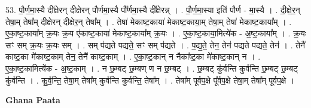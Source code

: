 \documentclass[17pt]{extarticle}
\begin{document}
53. पौ॒र्ण॒मा॒स्यै दी᳚क्षेरन् दीक्षेरन् पौर्णमा॒स्यै पौ᳚र्णमा॒स्यै दी᳚क्षेरन्न् । . पौ॒र्ण॒मा॒स्या इति॑ पौर्ण - मा॒स्यै । . दी॒क्षे॒र॒न् तेषा॒म् तेषा᳚म् दीक्षेरन् दीक्षेर॒न् तेषा᳚म् । . तेषा॑ मेकाष्ट॒काया॑ मेकाष्ट॒काया॒म् तेषा॒म् तेषा॑ मेकाष्ट॒काया᳚म् । . ए॒का॒ष्ट॒काया᳚म् क्र॒यः क्र॒य ए॑काष्ट॒काया॑ मेकाष्ट॒काया᳚म् क्र॒यः । . ए॒का॒ष्ट॒काया॒मित्ये॑क - अ॒ष्ट॒काया᳚म् । . क्र॒यः सꣳ सम् क्र॒यः क्र॒यः सम् । . सम् प॑द्यते पद्यते॒ सꣳ सम् प॑द्यते । . प॒द्य॒ते॒ तेन॒ तेन॑ पद्यते पद्यते॒ तेन॑ । . तेनै॑ काष्ट॒का मे॑काष्ट॒काम् तेन॒ तेनै॑ काष्ट॒काम् । . ए॒का॒ष्ट॒कान् न नैका᳚ष्ट॒का मे॑काष्ट॒कान् न । . ए॒का॒ष्ट॒कामित्ये॑क - अ॒ष्ट॒काम् । . न छ॒म्बट् छ॒म्बण् ण न छ॒म्बट् । . छ॒म्बट् कु॑र्वन्ति कुर्वन्ति छ॒म्बट् छ॒म्बट् कु॑र्वन्ति । . कु॒र्व॒न्ति॒ तेषा॒म् तेषा᳚म् कुर्वन्ति कुर्वन्ति॒ तेषा᳚म् । . तेषा᳚म् पूर्वप॒क्षे पू᳚र्वप॒क्षे तेषा॒म् तेषा᳚म् पूर्वप॒क्षे । \newline

\textbf{Ghana Paata } \newline
\end{document}
